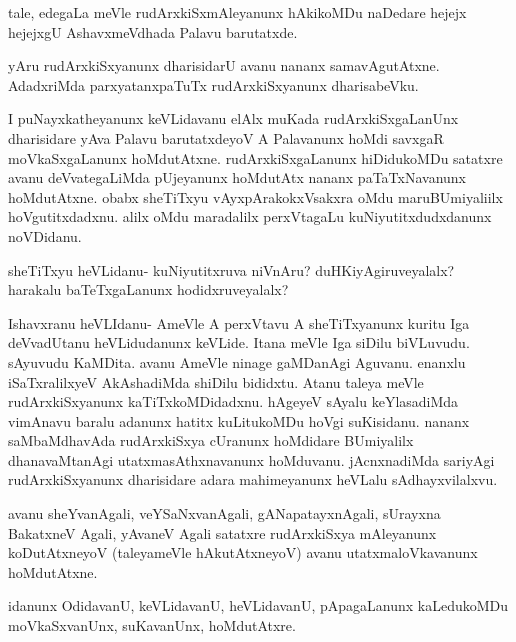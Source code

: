 \documentclass{article}
\begin{document}
\begin{mng}%
tale, edegaLa meVle rudArxkiSxmAleyanunx hAkikoMDu naDedare hejejx 
hejejxgU AshavxmeVdhada Palavu barutatxde.
\end{mng}

\begin{mng}%
yAru rudArxkiSxyanunx dharisidarU avanu nananx samavAgutAtxne. 
AdadxriMda parxyatanxpaTuTx rudArxkiSxyanunx dharisabeVku.
\end{mng}

\begin{mng}%
I puNayxkatheyanunx keVLidavanu elAlx muKada rudArxkiSxgaLanUnx 
dharisidare yAva Palavu barutatxdeyoV A Palavanunx hoMdi savxgaR 
moVkaSxgaLanunx hoMdutAtxne. rudArxkiSxgaLanunx hiDidukoMDu satatxre 
avanu deVvategaLiMda pUjeyanunx hoMdutAtx nananx paTaTxNavanunx 
hoMdutAtxne. obabx sheTiTxyu vAyxpArakokxVsakxra oMdu maruBUmiyaliilx 
hoVgutitxdadxnu. alilx oMdu maradalilx perxVtagaLu 
kuNiyutitxdudxdanunx noVDidanu.
\end{mng}

\begin{mng}%
sheTiTxyu heVLidanu- kuNiyutitxruva niVnAru? duHKiyAgiruveyalalx? 
harakalu baTeTxgaLanunx hodidxruveyalalx?
\end{mng}

\begin{mng}%
Ishavxranu heVLIdanu- AmeVle A perxVtavu A sheTiTxyanunx kuritu Iga 
deVvadUtanu heVLidudanunx keVLide. Itana meVle Iga siDilu biVLuvudu. 
sAyuvudu KaMDita. avanu AmeVle ninage gaMDanAgi Aguvanu. enanxlu 
iSaTxralilxyeV AkAshadiMda shiDilu bididxtu. Atanu taleya meVle 
rudArxkiSxyanunx kaTiTxkoMDidadxnu. hAgeyeV sAyalu keYlasadiMda 
vimAnavu baralu adanunx hatitx kuLitukoMDu hoVgi suKisidanu. nananx 
saMbaMdhavAda rudArxkiSxya cUranunx hoMdidare BUmiyalilx 
dhanavaMtanAgi utatxmasAthxnavanunx hoMduvanu. jAcnxnadiMda sariyAgi 
rudArxkiSxyanunx dharisidare adara mahimeyanunx heVLalu 
sAdhayxvilalxvu.
\end{mng}

\begin{mng}%
avanu sheYvanAgali, veYSaNxvanAgali, gANapatayxnAgali, sUrayxna 
BakatxneV Agali, yAvaneV Agali satatxre rudArxkiSxya mAleyanunx 
koDutAtxneyoV (taleyameVle hAkutAtxneyoV) avanu utatxmaloVkavanunx 
hoMdutAtxne.
\end{mng}

\begin{mng}%
idanunx OdidavanU, keVLidavanU, heVLidavanU, pApagaLanunx kaLedukoMDu 
moVkaSxvanUnx, suKavanUnx, hoMdutAtxre.
\end{mng}
\end{document}

